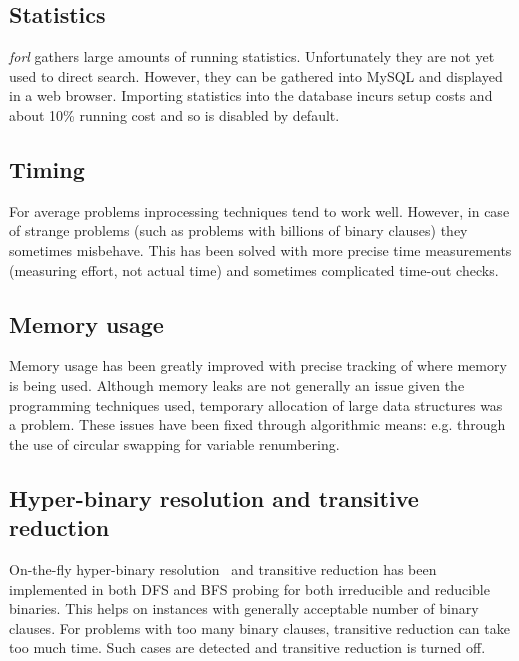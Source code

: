 \documentclass[final]{ieee}
\begin{document}
\subsection{Statistics}
\emph{forl} gathers large amounts of running statistics. Unfortunately they are not yet used to direct search. However, they can be gathered into MySQL and displayed in a web browser. Importing statistics into the database incurs setup costs and about 10\% running cost and so is disabled by default.

\subsection{Timing}
For average problems inprocessing techniques tend to work well. However, in case of strange problems (such as problems with billions of binary clauses) they sometimes misbehave. This has been solved with more precise time measurements (measuring effort, not actual time) and sometimes complicated time-out checks.

\subsection{Memory usage}
Memory usage has been greatly improved with precise tracking of where memory is being used. Although memory leaks are not generally an issue given the programming techniques used, temporary allocation of large data structures was a problem. These issues have been fixed through algorithmic means: e.g. through the use of circular swapping for variable renumbering.

\subsection{Hyper-binary resolution and transitive reduction}
On-the-fly hyper-binary resolution~\cite{DBLP:conf/sat/BacchusW03} and transitive reduction has been implemented in both DFS and BFS probing for both irreducible and reducible binaries. This helps on instances with generally acceptable number of binary clauses. For problems with too many binary clauses, transitive reduction can take too much time. Such cases are detected and transitive reduction is turned off.
\end{document}
